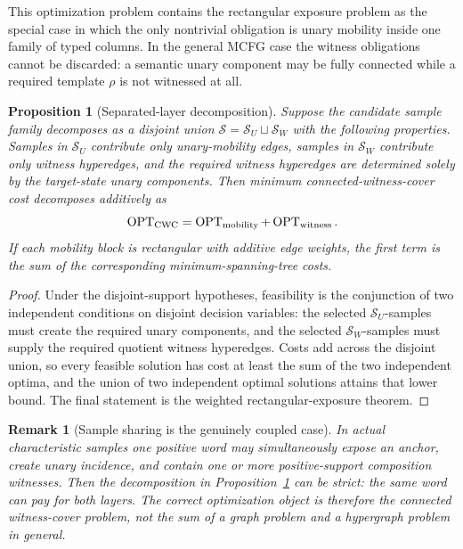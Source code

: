 \documentclass[11pt]{article}
\newtheorem{proposition}[definition]{Proposition}
\newtheorem{remark}[definition]{Remark}
\begin{document}
This optimization problem contains the rectangular exposure problem as the
special case in which the only nontrivial obligation is unary mobility inside
one family of typed columns.  In the general MCFG case the witness obligations
cannot be discarded: a semantic unary component may be fully connected while a
required template $\rho$ is not witnessed at all.

\begin{proposition}[Separated-layer decomposition]
\label{prop:separated-layer-decomposition}
Suppose the candidate sample family decomposes as a disjoint union
$\mathcal S=\mathcal S_U\sqcup\mathcal S_W$ with the following properties.
Samples in $\mathcal S_U$ contribute only unary-mobility edges, samples in
$\mathcal S_W$ contribute only witness hyperedges, and the required witness
hyperedges are determined solely by the target-state unary components.  Then
minimum connected-witness-cover cost decomposes additively as
\[
  \operatorname{OPT}_{\rm CWC}
  =
  \operatorname{OPT}_{\rm mobility}
  +
  \operatorname{OPT}_{\rm witness}.
\]
If each mobility block is rectangular with additive edge weights, the first
term is the sum of the corresponding minimum-spanning-tree costs.
\end{proposition}
\begin{proof}
Under the disjoint-support hypotheses, feasibility is the conjunction of two
independent conditions on disjoint decision variables: the selected
$\mathcal S_U$-samples must create the required unary components, and the
selected $\mathcal S_W$-samples must supply the required quotient witness
hyperedges.  Costs add across the disjoint union, so every feasible solution
has cost at least the sum of the two independent optima, and the union of two
independent optimal solutions attains that lower bound.  The final statement
is the weighted rectangular-exposure theorem.
\end{proof}

\begin{remark}[Sample sharing is the genuinely coupled case]
In actual characteristic samples one positive word may simultaneously expose
an anchor, create unary incidence, and contain one or more positive-support
composition witnesses.  Then the decomposition in
Proposition~\ref{prop:separated-layer-decomposition} can be strict: the same
word can pay for both layers.  The correct optimization object is therefore the
connected witness-cover problem, not the sum of a graph problem and a
hypergraph problem in general.
\end{remark}
\end{document}
